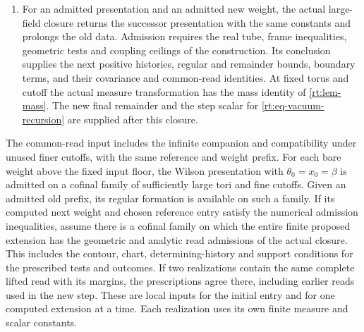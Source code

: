 \documentclass[11pt,letterpaper,reqno]{amsart}
\numberwithin{equation}{section}
\theoremstyle{definition}
\theoremstyle{remark}
\begin{document}
\begin{enumerate}
  \(\kappa_0>4\). Dropping the logarithmic improvement in
  the marked estimate only enlarges this envelope.
\item For an admitted presentation and an admitted new weight, the
  actual large-field closure returns the successor presentation
  with the same constants and prolongs the old data. Admission
  requires the real tube, frame inequalities, geometric tests and
  coupling ceilings of the construction. Its conclusion supplies the
  next positive histories, regular and remainder bounds, boundary
  terms, and their covariance and common-read identities. At fixed
  torus and cutoff the actual measure transformation has the mass identity
  of \cref{rt:lem-mass}. The new final remainder and the step scalar
  for \cref{rt:eq-vacuum-recursion} are supplied after this closure.
\end{enumerate}

The common-read input includes the infinite companion and compatibility
under unused finer cutoffs, with the same reference and weight prefix.
For each bare weight above the fixed input floor, the Wilson
presentation with $\theta_0=x_0=\beta$ is admitted on a cofinal family
of sufficiently large tori and fine cutoffs. Given an admitted old
prefix, its regular formation is available on such a family. If its
computed next weight and chosen reference entry satisfy the numerical
admission inequalities, assume there is a cofinal family on which the
entire finite proposed extension has the geometric and analytic read
admissions of the actual closure. This includes the contour, chart,
determining-history and support conditions for the prescribed tests and
outcomes. If two realizations contain the same complete lifted read
with its margins, the prescriptions agree there, including earlier
reads used in the new step. These are local inputs for the initial
entry and for one computed extension at a time. Each realization uses
its own finite measure and scalar constants.
\end{document}

